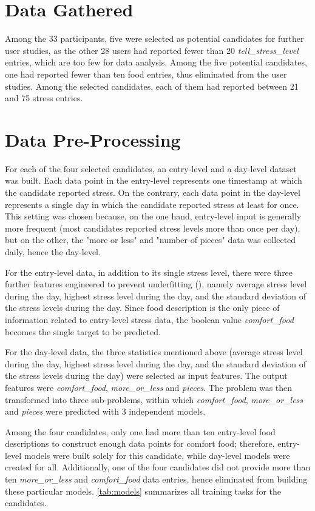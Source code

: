 \section{Data Gathered}
Among the 33 participants, five were selected as potential candidates for further user studies, as the other 28 users had reported fewer than 20 \emph{tell\_stress\_level} entries, which are too few for data analysis. Among the five potential candidates, one had reported fewer than ten food entries, thus eliminated from the user studies. Among the selected candidates, each of them had reported between 21 and 75 stress entries.

\section{Data Pre-Processing}
For each of the four selected candidates, an entry-level and a day-level dataset was built. Each data point in the entry-level represents one timestamp at which the candidate reported stress. On the contrary, each data point in the day-level represents a single day in which the candidate reported stress at least for once. This setting was chosen because, on the one hand, entry-level input is generally more frequent (most candidates reported stress levels more than once per day), but on the other, the "more or less" and "number of pieces" data was collected daily, hence the day-level.

For the entry-level data, in addition to its single stress level, there were three further features engineered to prevent underfitting (\cite{42_underfitting}), namely average stress level during the day, highest stress level during the day, and the standard deviation of the stress levels during the day. Since food description is the only piece of information related to entry-level stress data, the boolean value \emph{comfort\_food} becomes the single target to be predicted.

For the day-level data, the three statistics mentioned above (average stress level during the day, highest stress level during the day, and the standard deviation of the stress levels during the day) were selected as input features. The output features were \emph{comfort\_food}, \emph{more\_or\_less} and \emph{pieces}. The problem was then transformed into three sub-problems, within which \emph{comfort\_food}, \emph{more\_or\_less} and \emph{pieces} were predicted with 3 independent models.

Among the four candidates, only one had more than ten entry-level food descriptions to construct enough data points for comfort food; therefore, entry-level models were built solely for this candidate, while day-level models were created for all. Additionally, one of the four candidates did not provide more than ten \emph{more\_or\_less} and \emph{comfort\_food} data entries, hence eliminated from building these particular models. \autoref{tab:models} summarizes all training tasks for the candidates.

